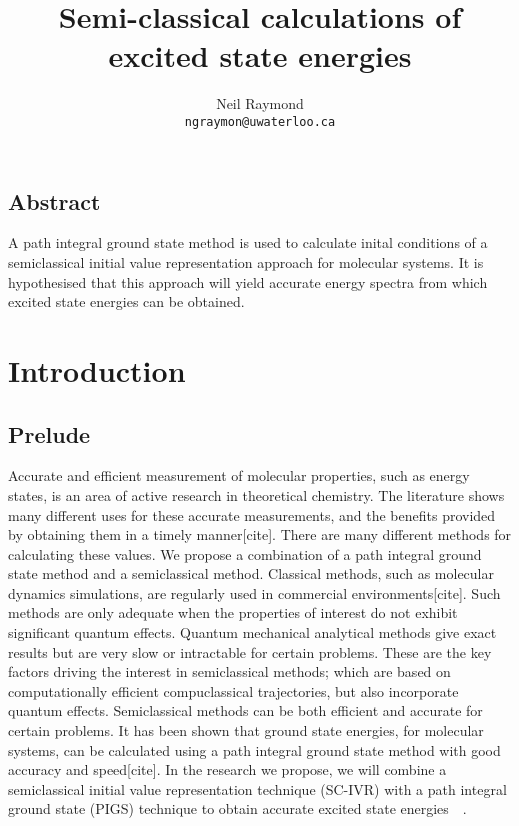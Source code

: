 \documentclass[12pt,letterpaper,oneside,final,titlepage]{article}               %
\numberwithin{equation}{section} %
\begin{document}
    \title{Semi-classical calculations of excited state energies}
    \author{Neil Raymond
           \\ \texttt{ngraymon@uwaterloo.ca}}
    \date{}
    \maketitle

\doublespacing

\subsection*{Abstract}
A path integral ground state method is used to calculate inital conditions of a semiclassical initial value representation approach for molecular systems. 
It is hypothesised that this approach will yield accurate energy spectra from which excited state energies can be obtained. 

\section{Introduction}

\subsection{Prelude}
Accurate and efficient measurement of molecular properties, such as energy states, is an area of active research in theoretical chemistry. 
The literature shows many different uses for these accurate measurements, and the benefits provided by obtaining them in a timely manner[cite]. 
There are many different methods for calculating these values. 
We propose a combination of a path integral ground state method and a semiclassical method. 
Classical methods, such as molecular dynamics simulations, are regularly used in commercial environments[cite]. 
Such methods are only adequate when the properties of interest do not exhibit significant quantum effects. 
Quantum mechanical analytical methods give exact results but are very slow or intractable for certain problems. 
These are the key factors driving the interest in semiclassical methods; which are based on computationally efficient compuclassical trajectories, but also incorporate quantum effects. 
Semiclassical methods can be both efficient and accurate for certain problems. \newline
It has been shown that ground state energies, for molecular systems, can be calculated using a path integral ground state method with good accuracy and speed[cite]. 
In the research we propose, we will combine a semiclassical initial value representation technique (SC-IVR) with a path integral 
ground state (PIGS) technique to obtain accurate excited state energies~\cite{issack2007semiclassical}~\cite{schmidt2014inclusion}.
\end{document}
